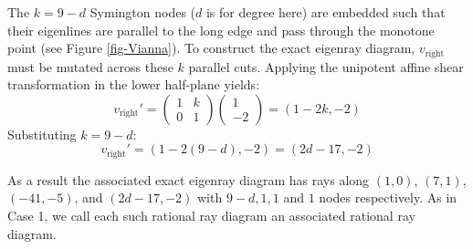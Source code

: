 \documentclass[11pt, reqno]{amsart}
\theoremstyle{definition}
\begin{document}
The $k = 9-d$ Symington nodes ($d$ is for degree here) are embedded such that their eigenlines are parallel to the long edge and pass through the monotone point (see Figure \ref{fig-Vianna}). To construct the exact eigenray diagram, $v_{\text{right}}$ must be mutated across these $k$ parallel cuts. Applying the unipotent affine shear transformation in the lower half-plane yields:
\begin{equation}
    v_{\text{right}}' = \begin{pmatrix} 1 & k \\ 0 & 1 \end{pmatrix} \begin{pmatrix} 1 \\ -2 \end{pmatrix} = (1 - 2k, -2)
\end{equation}
Substituting $k = 9 - d$:
\begin{equation}
    v_{\text{right}}' = (1 - 2(9 - d), -2) = (2d - 17, -2)
\end{equation}

As a result the associated exact eigenray diagram has rays along  $(1, 0)$, $(7, 1)$, $(-41, -5)$, and $(2d - 17, -2)$ with $9-d,1,1$ and $1$ nodes respectively. As in Case 1, we call each such rational ray diagram an associated rational ray diagram.


\end{document}
